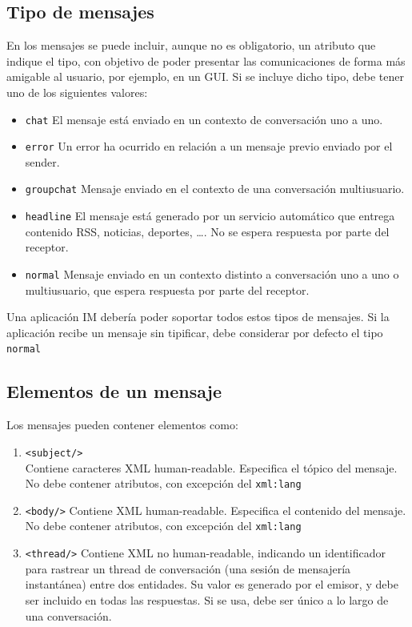 \documentclass[a4paper, 11pt]{article} %
\begin{document}
  \subsection{Tipo de mensajes}
    En los mensajes se puede incluir, aunque no es obligatorio, un atributo que indique el tipo, con objetivo de poder
    presentar las comunicaciones de forma más amigable al usuario, por ejemplo, en un GUI. Si se incluye dicho tipo, debe
    tener uno de los siguientes valores:
    \begin{itemize}
     \item \texttt{chat} El mensaje está enviado en un contexto de conversación uno a uno.
     \item \texttt{error} Un error ha ocurrido en relación a un mensaje previo enviado por el sender.
     \item \texttt{groupchat} Mensaje enviado en el contexto de una conversación multiusuario.
     \item \texttt{headline} El mensaje está generado por un servicio automático que entrega contenido RSS, noticias, 
     deportes, \ldots. No se espera respuesta por parte del receptor.
     \item \texttt{normal} Mensaje enviado en un contexto distinto a conversación uno a uno o multiusuario, que espera
     respuesta por parte del receptor.
    \end{itemize}
    Una aplicación IM debería poder soportar todos estos tipos de mensajes. Si la aplicación recibe un mensaje sin tipificar,
    debe considerar por defecto el tipo \texttt{normal}  
  
  \subsection{Elementos de un mensaje}
    Los mensajes pueden contener elementos como:
    \begin{enumerate}
     \item \texttt{<subject/>}\\
     Contiene caracteres XML human-readable. Especifica el tópico del mensaje. No debe contener atributos, con excepción
     del \texttt{xml:lang}
     \item \texttt{<body/>}
     Contiene XML human-readable. Especifica el contenido del mensaje. No debe contener atributos, con excepción
     del \texttt{xml:lang}
     \item \texttt{<thread/>}
     Contiene XML no human-readable, indicando un identificador para rastrear un thread de conversación (una sesión de
     mensajería instantánea) entre dos entidades. Su valor es generado por el emisor, y debe ser incluido en todas 
     las respuestas. Si se usa, debe ser único a lo largo de una conversación.
    \end{enumerate}
\end{document}
